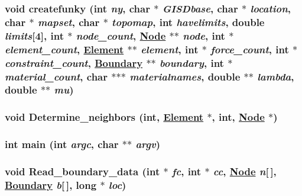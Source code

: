 \hypertarget{oldpreprocess_8C_a1}{
\subsubsection[createfunky]{\setlength{\rightskip}{0pt plus 5cm}void createfunky (int {\em ny}, char $\ast$ {\em GISDbase}, char $\ast$ {\em location}, char $\ast$ {\em mapset}, char $\ast$ {\em topomap}, int {\em havelimits}, double {\em limits}\mbox{[}4\mbox{]}, int $\ast$ {\em node\_\-count}, \hyperlink{classNode}{Node} $\ast$$\ast$ {\em node}, int $\ast$ {\em element\_\-count}, \hyperlink{classElement}{Element} $\ast$$\ast$ {\em element}, int $\ast$ {\em force\_\-count}, int $\ast$ {\em constraint\_\-count}, \hyperlink{classBoundary}{Boundary} $\ast$$\ast$ {\em boundary}, int $\ast$ {\em material\_\-count}, char $\ast$$\ast$$\ast$ {\em materialnames}, double $\ast$$\ast$ {\em lambda}, double $\ast$$\ast$ {\em mu})}}
\label{oldpreprocess_8C_a1}


\hypertarget{oldpreprocess_8C_a8}{
\subsubsection[Determine\_\-neighbors]{\setlength{\rightskip}{0pt plus 5cm}void Determine\_\-neighbors (int, \hyperlink{classElement}{Element} $\ast$, int, \hyperlink{classNode}{Node} $\ast$)}}
\label{oldpreprocess_8C_a8}


\hypertarget{oldpreprocess_8C_a10}{
\subsubsection[main]{\setlength{\rightskip}{0pt plus 5cm}int main (int {\em argc}, char $\ast$$\ast$ {\em argv})}}
\label{oldpreprocess_8C_a10}


\hypertarget{oldpreprocess_8C_a13}{
\subsubsection[Read\_\-boundary\_\-data]{\setlength{\rightskip}{0pt plus 5cm}void Read\_\-boundary\_\-data (int $\ast$ {\em fc}, int $\ast$ {\em cc}, \hyperlink{classNode}{Node} {\em n}\mbox{[}$\,$\mbox{]}, \hyperlink{classBoundary}{Boundary} {\em b}\mbox{[}$\,$\mbox{]}, long $\ast$ {\em loc})}}
\label{oldpreprocess_8C_a13}


